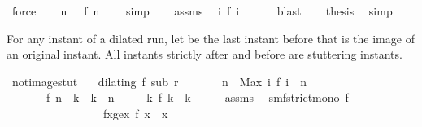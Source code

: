 \begin{isabellebody}
\ force\isanewline
\ \ \isamarkupfalse%
\ {\isacartoucheopen}{\isasymforall}n\ {\isasymnoteq}\ {}{\isachardot}\ {\isasymnot}{\isacharparenleft}f\ n\ {\isasymle}\ {}{\isacharparenright}{\isacartoucheclose}\ \isamarkupfalse%
\ simp\isanewline
\ \ \isamarkupfalse%
\ assms{\isacharparenleft}{}{\isacharparenright}\ \isamarkupfalse%
\ {\isacartoucheopen}{\isacharbraceleft}i{\isachardot}\ f\ i\ {\isasymle}\ {}{\isacharbraceright}\ {\isacharequal}\ {\isacharbraceleft}{}{\isacharbraceright}{\isacartoucheclose}\ \isamarkupfalse%
\ blast\isanewline
\ \ \isamarkupfalse%
\ {\isacharquery}thesis\ \isamarkupfalse%
\ simp\isanewline
{}\isamarkupfalse%
%
\endisatagproof
{\isafoldproof}%
%
\isadelimproof
%
\endisadelimproof
%
\begin{isamarkuptext}%
For any instant  of a dilated run, let  be the last 
  instant before  that is the image of an original instant. All instants
  strictly after  and before  are stuttering instants.%
\end{isamarkuptext}\isamarkuptrue%
\isamarkupfalse%
\ not{\isacharunderscore}image{\isacharunderscore}stut{\isacharcolon}\isanewline
\ \ \ {\isacartoucheopen}dilating\ f\ sub\ r{\isacartoucheclose}\isanewline
\ \ \ \ \ \ \ {\isacartoucheopen}n\ {\isacharequal}\ Max\ {\isacharbraceleft}i{\isachardot}\ f\ i\ {\isasymle}\ n{\isacharbraceright}{\isacartoucheclose}\isanewline
\ \ \ \ \ \ \ {\isacartoucheopen}f\ n\ {\isacharless}\ k\ {\isasymand}\ k\ {\isasymle}\ n{\isacartoucheclose}\isanewline
\ \ \ \ \ {\isacartoucheopen}{\isasymnexists}k\ f\ k\ {\isacharequal}\ k{\isacartoucheclose}\isanewline
%
\isadelimproof
%
\endisadelimproof
%
\isatagproof
{}\isamarkupfalse%
\ {\isacharminus}\isanewline
\ \ \isamarkupfalse%
\ assms{\isacharparenleft}{}{\isacharparenright}\ \isamarkupfalse%
\ smf{\isacharcolon}{\isacartoucheopen}strict{\isacharunderscore}mono\ f{\isacartoucheclose}\isanewline
\ \ \ \ \ \ \ \ \ \ \ \ \ \ \ \ \ fxge{\isacharcolon}{\isacartoucheopen}{\isasymforall}x{\isachardot}\ f\ x\ {\isasymge}\ x{\isacartoucheclose}\isanewline

\end{isabellebody}
